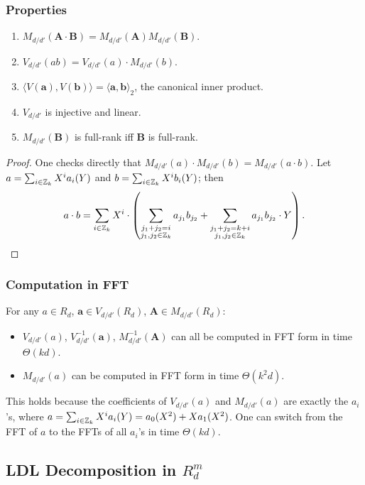 \subsubsection{Properties}

\begin{enumerate}
	\item $M_{d/d'}(\mathbf{A} \cdot \mathbf{B}) = M_{d/d'}(\mathbf{A}) M_{d/d'}(\mathbf{B})$.
	\item $V_{d/d'}(ab) = V_{d/d'}(a) \cdot M_{d/d'}(b)$.
	\item $\langle V(\mathbf{a}), V(\mathbf{b}) \rangle = \langle \mathbf{a}, \mathbf{b} \rangle_2$, the canonical inner product.
	\item $V_{d/d'}$ is injective and linear.
	\item $M_{d/d'}(\mathbf{B})$ is full-rank iff $\mathbf{B}$ is full-rank.
\end{enumerate}

\begin{proof}
	One checks directly that $M_{d/d'}(a) \cdot M_{d/d'}(b) = M_{d/d'}(a \cdot b)$. Let $a = \sum_{i \in \mathbb{Z}_k} X^i a_i(Y)$ and $b = \sum_{i \in \mathbb{Z}_k} X^i b_i(Y)$; then
	\[
		a \cdot b = \sum_{i \in \mathbb{Z}_k} X^i \cdot \left( \sum_{\substack{j_1+j_2=i \\ j_1,j_2 \in \mathbb{Z}_k}} a_{j_1} b_{j_2} + \sum_{\substack{j_1+j_2=k+i \\ j_1,j_2 \in \mathbb{Z}_k}} a_{j_1} b_{j_2} \cdot Y \right).
	\]
\end{proof}

\subsubsection{Computation in FFT}

For any $a \in R_d$, $\mathbf{a} \in V_{d/d'}(R_d)$, $\mathbf{A} \in M_{d/d'}(R_d)$:
\begin{itemize}
	\item $V_{d/d'}(a)$, $V_{d/d'}^{-1}(\mathbf{a})$, $M_{d/d'}^{-1}(\mathbf{A})$ can all be computed in FFT form in time $\Theta(kd)$.
	\item $M_{d/d'}(a)$ can be computed in FFT form in time $\Theta(k^2 d)$.
\end{itemize}
This holds because the coefficients of $V_{d/d'}(a)$ and $M_{d/d'}(a)$ are exactly the $a_i$'s, where $a = \sum_{i \in \mathbb{Z}_k} X^i a_i(Y) = a_0(X^2) + Xa_1(X^2)$. One can switch from the FFT of $a$ to the FFTs of all $a_i$'s in time $\Theta(kd)$.

\subsection{LDL Decomposition in \texorpdfstring{$R_d^m$}{Rd\^{}m}}


